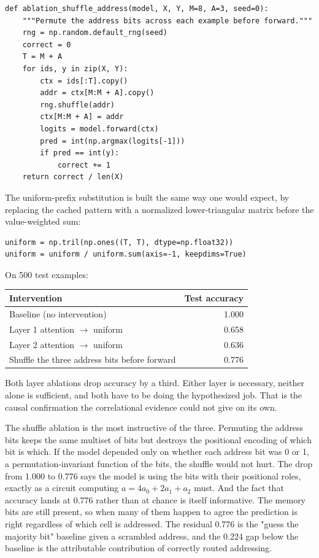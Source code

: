 \begin{lstlisting}
def ablation_shuffle_address(model, X, Y, M=8, A=3, seed=0):
    """Permute the address bits across each example before forward."""
    rng = np.random.default_rng(seed)
    correct = 0
    T = M + A
    for ids, y in zip(X, Y):
        ctx = ids[:T].copy()
        addr = ctx[M:M + A].copy()
        rng.shuffle(addr)
        ctx[M:M + A] = addr
        logits = model.forward(ctx)
        pred = int(np.argmax(logits[-1]))
        if pred == int(y):
            correct += 1
    return correct / len(X)
\end{lstlisting}

The uniform-prefix substitution is built the same way one would expect, by
replacing the cached pattern with a normalized lower-triangular matrix before
the value-weighted sum:

\begin{lstlisting}
uniform = np.tril(np.ones((T, T), dtype=np.float32))
uniform = uniform / uniform.sum(axis=-1, keepdims=True)
\end{lstlisting}

On 500 test examples:

\begin{center}
\begin{tabular}{@{}lr@{}}
\toprule
Intervention & Test accuracy \\
\midrule
Baseline (no intervention) & 1.000 \\
Layer 1 attention $\to$ uniform & 0.658 \\
Layer 2 attention $\to$ uniform & 0.636 \\
Shuffle the three address bits before forward & 0.776 \\
\bottomrule
\end{tabular}
\end{center}

Both layer ablations drop accuracy by a third. Either layer is necessary,
neither alone is sufficient, and both have to be doing the hypothesized job.
That is the causal confirmation the correlational evidence could not give on its
own.

The shuffle ablation is the most instructive of the three. Permuting the address
bits keeps the same multiset of bits but destroys the positional encoding of
which bit is which. If the model depended only on whether each address bit was 0
or 1, a permutation-invariant function of the bits, the shuffle would not hurt.
The drop from 1.000 to 0.776 says the model is using the bits with their
positional roles, exactly as a circuit computing $a = 4 a_0 + 2 a_1 + a_2$ must.
And the fact that accuracy lands at 0.776 rather than at chance is itself
informative. The memory bits are still present, so when many of them happen to
agree the prediction is right regardless of which cell is addressed. The residual
0.776 is the "guess the majority bit" baseline given a scrambled address, and the
0.224 gap below the baseline is the attributable contribution of correctly routed
addressing.
